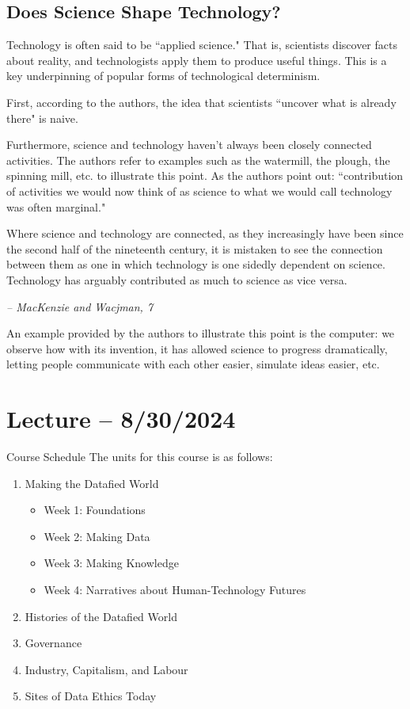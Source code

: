 \documentclass[openany]{book}
\begin{document}
\subsection{Does Science Shape Technology?}
Technology is often said to be ``applied science." That is, scientists discover facts about reality, and technologists apply them to produce useful things. This is a key underpinning of popular forms of technological determinism.

First, according to the authors, the idea that scientists ``uncover what is already there" is naive.

Furthermore, science and technology haven't always been closely connected activities. The authors refer to examples such as the watermill, the plough, the spinning mill, etc. to illustrate this point. As the authors point out: ``contribution of activities we would now think of as science to what we would call technology was often marginal."

\begin{fancyquotes}
	Where science and technology are connected, as they increasingly have been since the second half of the nineteenth century, it is mistaken to see the connection between them as one in which technology is one sidedly dependent on science. Technology has arguably contributed as much to science as vice versa.
	
	\begin{flushright}
		\emph{-- MacKenzie and Wacjman, 7}
	\end{flushright}
\end{fancyquotes}

\begin{example}
	An example provided by the authors to illustrate this point is the computer: we observe how with its invention, it has allowed science to progress dramatically, letting people communicate with each other easier, simulate ideas easier, etc.
\end{example}

\section{Lecture -- 8/30/2024}
\begin{miscbox}{Course Schedule}
	The units for this course is as follows:
	\begin{enumerate}
		\item Making the Datafied World
		\begin{itemize}
			\item Week 1: Foundations
			\item Week 2: Making Data
			\item Week 3: Making Knowledge
			\item Week 4: Narratives about Human-Technology Futures
		\end{itemize}
		\item Histories of the Datafied World
		\item Governance
		\item Industry, Capitalism, and Labour
		\item Sites of Data Ethics Today
	\end{enumerate}
\end{miscbox}
\end{document}

